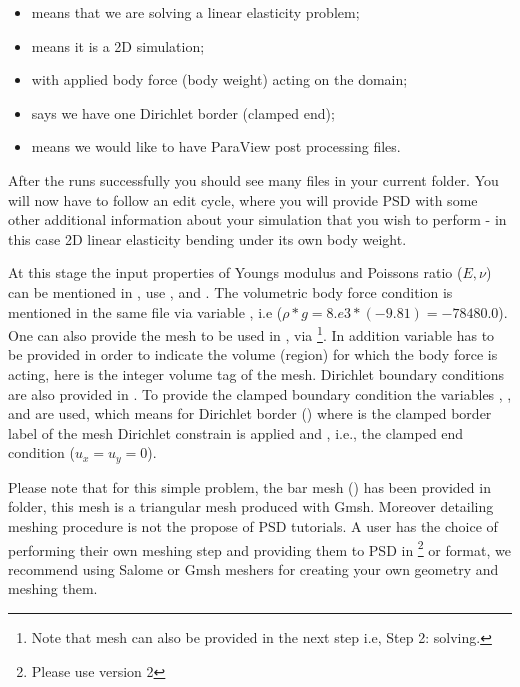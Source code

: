\begin{itemize}
\item {} means that we are solving a linear elasticity problem;
\item {} means it is a 2D simulation;
\item {} with applied body force (body weight) acting on the domain;
\item {} says we have one Dirichlet border (clamped end);
\item {} means we would like to have ParaView post processing files.
\end{itemize}

After the  runs successfully you should see many
 files in your current folder. You will now have to follow an
edit cycle, where you will provide PSD with some other additional
information about your simulation that you wish to perform - in this
case 2D linear elasticity bending under its own body weight.

At this stage the input properties of Youngs modulus and Poissons ratio
(\(E,\nu\)) can be mentioned in , use
, and . The volumetric body force
condition is mentioned in the same file via variable
, i.e (\(\rho*g=8.e3*(-9.81)=-78480.0\)). One can
also provide the mesh to be used in , via
\footnote{Note that mesh can also be provided in the next step i.e, Step 2: solving.}.
In addition variable  has to be provided in order to
indicate the volume (region) for which the body force is acting, here
 is the integer volume tag of the mesh. Dirichlet boundary
conditions are also provided in . To provide
the clamped boundary condition the variables ,
, and  are used, which means for Dirichlet
border  () where  is the clamped border
label of the mesh Dirichlet constrain is applied and ,
 i.e., the clamped end condition (\(u_x=u_y=0\)).

Please note that for this simple problem, the bar mesh ()
has been provided in  folder, this mesh is a
triangular mesh produced with Gmsh. Moreover detailing meshing procedure
is not the propose of PSD tutorials. A user has the choice of performing
their own meshing step and providing them to PSD in
\footnote{Please use version 2} or  format, we
recommend using Salome or Gmsh meshers for creating your own geometry
and meshing them.

